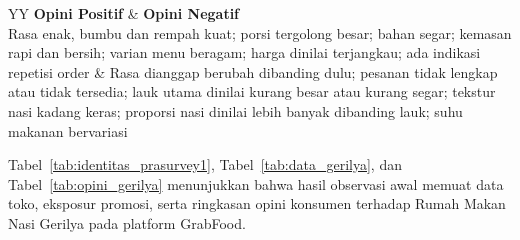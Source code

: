 \begin{table}[h!]
    \centering
    \caption{Ringkasan Opini Konsumen Rumah Makan Nasi Gerilya}
    \label{tab:opini_gerilya}
    \begin{tabularx}{\textwidth}{YY}
        \toprule
        \textbf{Opini Positif}                                                                                                                                                    & \textbf{Opini Negatif}                                        \\
        \midrule
        Rasa enak, bumbu dan rempah kuat; porsi tergolong besar; bahan segar; kemasan rapi dan bersih; varian menu beragam; harga dinilai terjangkau; ada indikasi repetisi order &
        Rasa dianggap berubah dibanding dulu; pesanan tidak lengkap atau tidak tersedia; lauk utama dinilai kurang besar atau kurang segar; tekstur nasi kadang keras; proporsi nasi dinilai lebih banyak dibanding lauk; suhu makanan bervariasi \\
        \bottomrule
    \end{tabularx}
\end{table}

\FloatBarrier
Tabel~\ref{tab:identitas_prasurvey1}, Tabel~\ref{tab:data_gerilya}, dan Tabel~\ref{tab:opini_gerilya} menunjukkan bahwa hasil observasi awal memuat data toko, eksposur promosi, serta ringkasan opini konsumen terhadap Rumah Makan Nasi Gerilya pada platform GrabFood.

